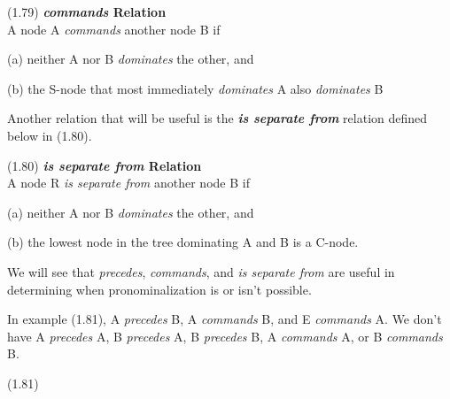 \documentclass{article}
\begin{document}
\begin{enumerate*}
\item[(1.79)] \textbf{\textit{commands} Relation}\\
A node A \textit{commands} another node B if
    \begin{enumerate*}
    \item[(a)] neither A nor B \textit{dominates} the other, and
    \item[(b)] the S-node that most immediately \textit{dominates} 
    A also \textit{dominates} B
    \end{enumerate*}
\end{enumerate*}

Another relation that will be useful is the
\textbf{\textit{is separate from}} relation defined below in
(1.80).

\begin{enumerate*}
\item[(1.80)] \textbf{\textit{is separate from} Relation}\\
A node R \textit{is separate from} another node B if
    \begin{enumerate*}
    \item[(a)] neither A nor B \textit{dominates} the other, and
    \item[(b)] the lowest node in the tree dominating A
    and B is a C-node.
    \end{enumerate*}
\end{enumerate*}

We will see that \textit{precedes}, \textit{commands}, and
\textit{is separate from} are useful in determining when
pronominalization is or isn't possible.

In example (1.81), A \textit{precedes} B, A \textit{commands} B,
and E \textit{commands} A. We don't have A \textit{precedes} A,
B \textit{precedes} A, B \textit{precedes} B,
A \textit{commands} A, or B \textit{commands} B.

\bigbreak
\begin{minipage}{\textwidth}
\begin{enumerate*}
\item[(1.81)]
\end{enumerate*}
\bigbreak
\centering
{}
\bigbreak
\vbox{}
\end{minipage}
\bigbreak
\end{document}
